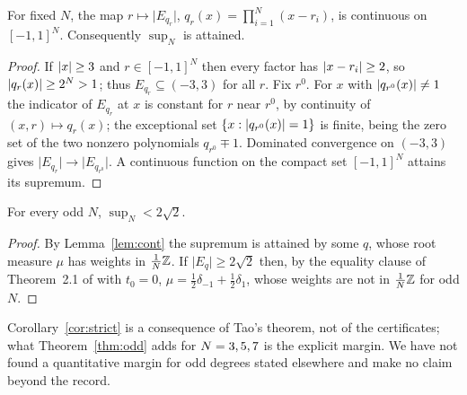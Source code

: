 \documentclass[11pt]{article}
\newcommand{\meas}[1]{\lvert #1 \rvert}
\begin{document}
\begin{lemma}\label{lem:cont}
For fixed $N$, the map $r\mapsto\meas{E_{q_r}}$, $q_r(x)=\prod_{i=1}^N(x-r_i)$, is continuous
on $[-1,1]^N$. Consequently $\sup_N$ is attained.
\end{lemma}

\begin{proof}
If $\lvert x \rvert\ge3$ and $r\in[-1,1]^N$ then every factor has $\lvert x-r_i \rvert\ge2$, so
$\lvert q_r(x) \rvert\ge2^N>1$; thus $E_{q_r}\subseteq(-3,3)$ for all $r$. Fix $r^0$. For $x$ with
$\lvert q_{r^0}(x) \rvert\neq1$ the indicator of $E_{q_r}$ at $x$ is constant for $r$ near $r^0$, by
continuity of $(x,r)\mapsto q_r(x)$; the exceptional set $\{x:\lvert q_{r^0}(x) \rvert=1\}$ is finite,
being the zero set of the two nonzero polynomials $q_{r^0}\mp1$. Dominated convergence on
$(-3,3)$ gives $\meas{E_{q_r}}\to\meas{E_{q_{r^0}}}$. A continuous function on the compact
set $[-1,1]^N$ attains its supremum.
\end{proof}

\begin{corollary}\label{cor:strict}
For every odd $N$, $\sup_N<2\sqrt2$.
\end{corollary}

\begin{proof}
By Lemma~\ref{lem:cont} the supremum is attained by some $q$, whose root measure $\mu$ has
weights in $\frac1N\mathbb{Z}$. If $\meas{E_q}\ge2\sqrt2$ then, by the equality clause of Theorem~2.1
of \cite{TaoNotes} with $t_0=0$, $\mu=\tfrac12\delta_{-1}+\tfrac12\delta_{1}$, whose weights
are not in $\frac1N\mathbb{Z}$ for odd $N$.
\end{proof}

Corollary~\ref{cor:strict} is a consequence of Tao's theorem, not of the certificates; what
Theorem~\ref{thm:odd} adds for $N=3, 5, 7$ is the explicit margin. We have not found a
quantitative margin for odd degrees stated elsewhere and make no claim beyond the record.
\end{document}
